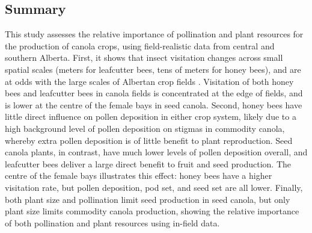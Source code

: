 \documentclass[12pt]{article} %
\begin{document}
\subsection{Summary} %
This study assesses the relative importance of pollination and plant resources for the production of canola crops, using field-realistic data from central and southern Alberta.
First, it shows that insect visitation changes across small spatial scales (meters for leafcutter bees, tens of meters for honey bees), and are at odds with the large scales of Albertan crop fields \citep{fritz2015}.
Visitation of both honey bees and leafcutter bees in canola fields is concentrated at the edge of fields, and is lower at the centre of the female bays in seed canola.	
Second, honey bees have little direct influence on pollen deposition in either crop system, likely due to a high background level of pollen deposition on stigmas in commodity canola, whereby extra pollen deposition is of little benefit to plant reproduction.
Seed canola plants, in contrast, have much lower levels of pollen deposition overall, and leafcutter bees deliver a large direct benefit to fruit and seed production. 
The centre of the female bays illustrates this effect: honey bees have a higher visitation rate, but pollen deposition, pod set, and seed set are all lower.
Finally, both plant size and pollination limit seed production in seed canola, but only plant size limits commodity canola production, showing the relative importance of both pollination and plant resources using in-field data.
\end{document}
